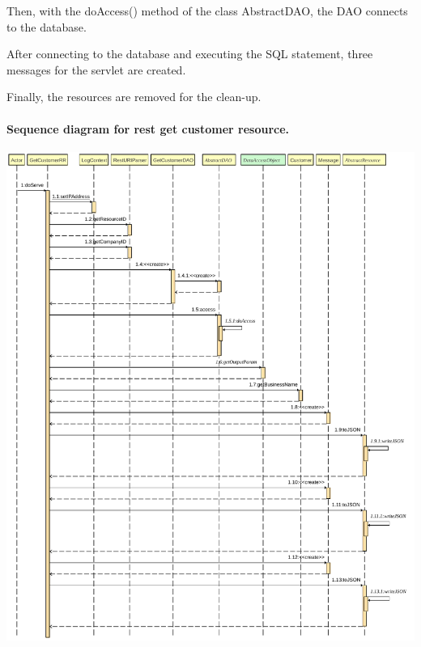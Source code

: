 Then, with the doAccess() method of the class AbstractDAO, the DAO connects to the database.

After connecting to the database and executing the SQL statement, three messages for the servlet are created.

Finally, the resources are removed for the clean-up.
\pagebreak
\paragraph[]{Sequence diagram for rest get customer resource.} \hspace{1mm} \par
\includegraphics[width=\textwidth, keepaspectratio]{resources/getcustomersequence.pdf}


